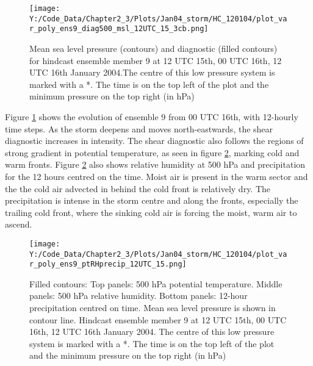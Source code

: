 \begin{figure}[h]
	\centering
	\texttt{[image: Y:/Code\_Data/Chapter2\_3/Plots/Jan04\_storm/HC\_120104/plot\_var\_poly\_ens9\_diag500\_msl\_12UTC\_15\_3cb.png]}
	\caption{Mean sea level pressure (contours) and diagnostic (filled contours) for hindcast ensemble member 9 at 12 UTC 15th, 00 UTC 16th, 12 UTC 16th January 2004.The centre of this low pressure system is marked with a *. The time is on the top left of the plot and the minimum pressure on the top right (in hPa)}\label{fig:HC_ens9}
	\centering
\end{figure}

Figure \ref{fig:HC_ens9} shows the evolution of ensemble 9 from 00 UTC 16th, with 12-hourly time steps. As the storm deepens and moves north-eastwards, the shear diagnostic increases in intensity. The shear diagnostic also follows the regions of strong gradient in potential temperature, as seen in figure \ref{fig:HC_ens9_pt_RH_precip}, marking cold and warm fronts. Figure \ref{fig:HC_ens9_pt_RH_precip} also shows relative humidity at 500 hPa and precipitation for the 12 hours centred on the time. Moist air is present in the warm sector and the the cold air advected in behind the cold front is relatively dry. The precipitation is intense in the storm centre and along the fronts, especially the trailing cold front, where the sinking cold air is forcing the moist, warm air to ascend.


\begin{figure}	%
	\texttt{[image: Y:/Code\_Data/Chapter2\_3/Plots/Jan04\_storm/HC\_120104/plot\_var\_poly\_ens9\_ptRHprecip\_12UTC\_15.png]}
	\caption{Filled contours: Top panels: 500 hPa potential temperature. Middle panels: 500 hPa relative humidity. Bottom panels: 12-hour precipitation centred on time. Mean sea level pressure is shown in contour line. Hindcast ensemble member 9 at 12 UTC 15th, 00 UTC 16th, 12 UTC 16th January 2004. The centre of this low pressure system is marked with a *. The time is on the top left of the plot and the minimum pressure on the top right (in hPa)}\label{fig:HC_ens9_pt_RH_precip}
	\centering
\end{figure}



